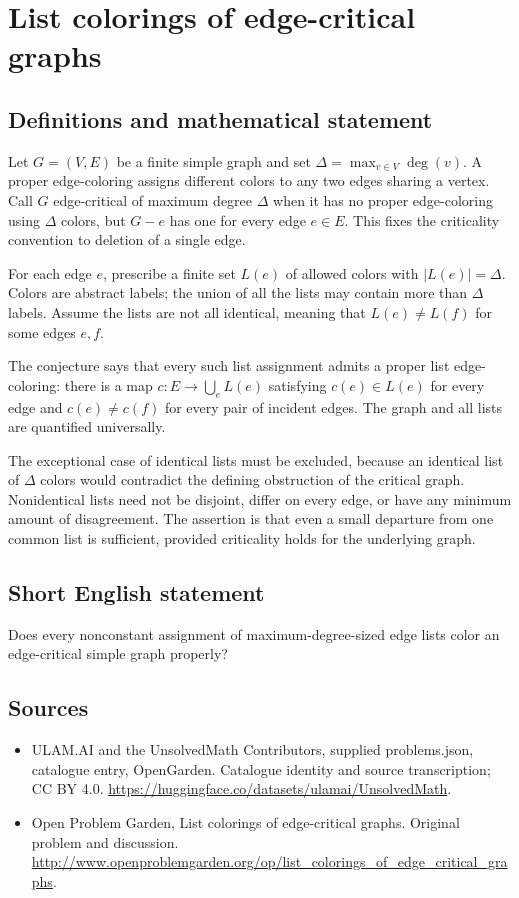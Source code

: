 \documentclass[11pt,a4paper]{article}
\begin{document}
\section*{List colorings of edge-critical graphs}\label{statement}

\subsection{Definitions and mathematical statement}
Let $G=(V,E)$ be a finite simple graph and set $\Delta=\max_{v\in V}\deg(v)$. A proper edge-coloring assigns different colors to any two edges sharing a vertex. Call $G$ edge-critical of maximum degree $\Delta$ when it has no proper edge-coloring using $\Delta$ colors, but $G-e$ has one for every edge $e\in E$. This fixes the criticality convention to deletion of a single edge.

For each edge $e$, prescribe a finite set $L(e)$ of allowed colors with $|L(e)|=\Delta$. Colors are abstract labels; the union of all the lists may contain more than $\Delta$ labels. Assume the lists are not all identical, meaning that $L(e)\ne L(f)$ for some edges $e,f$.

The conjecture says that every such list assignment admits a proper list edge-coloring: there is a map $c:E\to\bigcup_e L(e)$ satisfying $c(e)\in L(e)$ for every edge and $c(e)\ne c(f)$ for every pair of incident edges. The graph and all lists are quantified universally.

The exceptional case of identical lists must be excluded, because an identical list of $\Delta$ colors would contradict the defining obstruction of the critical graph. Nonidentical lists need not be disjoint, differ on every edge, or have any minimum amount of disagreement. The assertion is that even a small departure from one common list is sufficient, provided criticality holds for the underlying graph.
\subsection{Short English statement}
Does every nonconstant assignment of maximum-degree-sized edge lists color an edge-critical simple graph properly?
\subsection{Sources}
\begin{itemize}
\item[S1] ULAM.AI and the UnsolvedMath Contributors, supplied problems.json, catalogue entry, OpenGarden. Catalogue identity and source transcription; CC BY 4.0.
\url{https://huggingface.co/datasets/ulamai/UnsolvedMath}.
\item[S2] Open Problem Garden, List colorings of edge-critical graphs. Original problem and discussion.
\url{http://www.openproblemgarden.org/op/list_colorings_of_edge_critical_graphs}.
\end{itemize}
\end{document}

